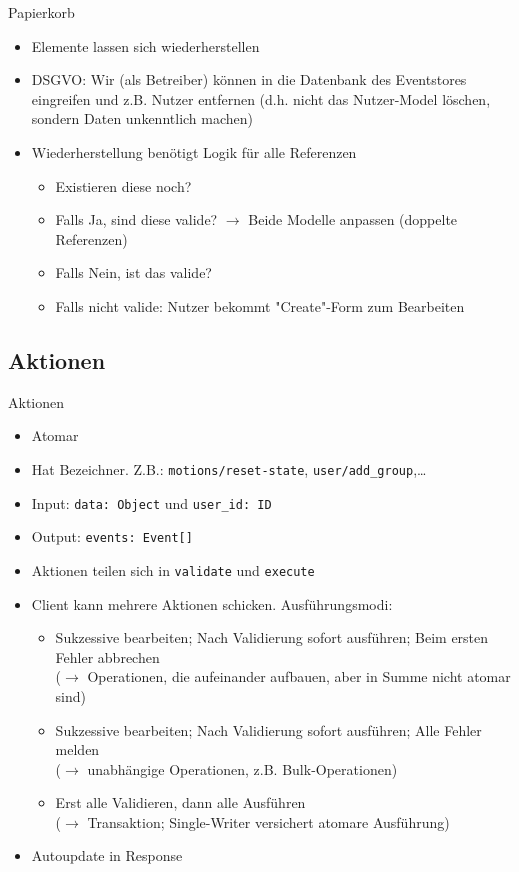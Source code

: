 \documentclass[10pt]{beamer}
\begin{document}
\begin{frame}{Papierkorb}
	\begin{itemize}
		\item Elemente lassen sich wiederherstellen
		\item DSGVO: Wir (als Betreiber) können in die Datenbank des Eventstores eingreifen und z.B. Nutzer entfernen (d.h. nicht das Nutzer-Model löschen, sondern Daten unkenntlich machen)
		\item Wiederherstellung benötigt Logik für alle Referenzen
		\begin{itemize}
			\item Existieren diese noch?
			\item Falls Ja, sind diese valide? $\rightarrow$ Beide Modelle anpassen (doppelte Referenzen)
			\item Falls Nein, ist das valide?
			\item Falls nicht valide: Nutzer bekommt "Create"-Form zum Bearbeiten
		\end{itemize}
	\end{itemize}
\end{frame}

\subsection{Aktionen}
\begin{frame}{Aktionen}
	\begin{itemize}
		\item Atomar
		\item Hat Bezeichner. Z.B.: \texttt{motions/reset-state}, \texttt{user/add\_group},\ldots
		\item Input: \texttt{data: Object} und \texttt{user\_id: ID}
		\item Output: \texttt{events: Event[]}
		\item Aktionen teilen sich in \texttt{validate} und \texttt{execute}
		\item Client kann mehrere Aktionen schicken. Ausführungsmodi:
		\begin{itemize}
			\item Sukzessive bearbeiten; Nach Validierung sofort ausführen; Beim ersten Fehler abbrechen\\
			($\rightarrow$ Operationen, die aufeinander aufbauen, aber in Summe nicht atomar sind)
			\item Sukzessive bearbeiten; Nach Validierung sofort ausführen; Alle Fehler melden\\
			($\rightarrow$ unabhängige Operationen, z.B. Bulk-Operationen)
			\item Erst alle Validieren, dann alle Ausführen\\
			($\rightarrow$ Transaktion; Single-Writer versichert atomare Ausführung)
		\end{itemize}
		\item Autoupdate in Response
	\end{itemize}
\end{frame}
\end{document}
